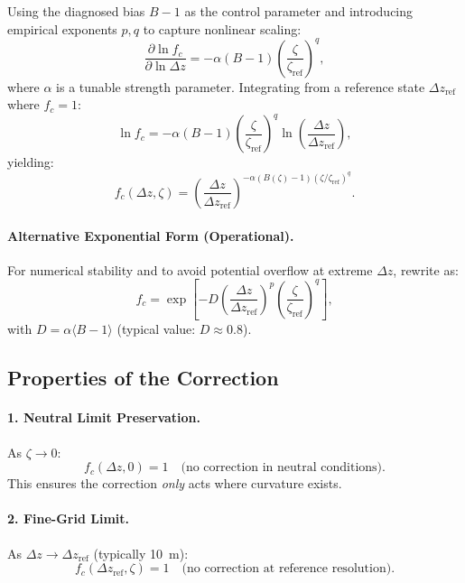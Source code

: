 \documentclass[twocolumn,11pt]{article}
\begin{document}
Using the diagnosed bias $B-1$ as the control parameter and introducing empirical exponents $p, q$ to capture nonlinear scaling:
\begin{equation}
\frac{\partial \ln f_c}{\partial \ln \Delta z} = -\alpha(B-1)\left(\frac{\zeta}{\zeta_{\text{ref}}}\right)^q,
\end{equation}
where $\alpha$ is a tunable strength parameter. Integrating from a reference state $\Delta z_{\text{ref}}$ where $f_c = 1$:
\begin{equation}
\ln f_c = -\alpha(B-1)\left(\frac{\zeta}{\zeta_{\text{ref}}}\right)^q \ln\left(\frac{\Delta z}{\Delta z_{\text{ref}}}\right),
\end{equation}
yielding:
\begin{equation}
\boxed{f_c(\Delta z,\zeta) = \left(\frac{\Delta z}{\Delta z_{\text{ref}}}\right)^{-\alpha(B(\zeta)-1)(\zeta/\zeta_{\text{ref}})^q}}.
\label{eq:fc_powerlaw}
\end{equation}

\paragraph{Alternative Exponential Form (Operational).} For numerical stability and to avoid potential overflow at extreme $\Delta z$, rewrite as:
\begin{equation}
f_c = \exp\left[-D\left(\frac{\Delta z}{\Delta z_{\text{ref}}}\right)^p\left(\frac{\zeta}{\zeta_{\text{ref}}}\right)^q\right],
\label{eq:fc_exponential}
\end{equation}
with $D = \alpha\langle B-1\rangle$ (typical value: $D \approx 0.8$).

\subsection{Properties of the Correction}

\paragraph{1. Neutral Limit Preservation.} As $\zeta \to 0$:
\begin{equation}
f_c(\Delta z,0) = 1 \quad \text{(no correction in neutral conditions)}.
\end{equation}
This ensures the correction \textit{only} acts where curvature exists.

\paragraph{2. Fine-Grid Limit.} As $\Delta z \to \Delta z_{\text{ref}}$ (typically 10~m):
\begin{equation}
f_c(\Delta z_{\text{ref}},\zeta) = 1 \quad \text{(no correction at reference resolution)}.
\end{equation}
\end{document}
